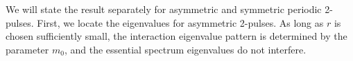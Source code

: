 \documentclass[11pt,reqno]{amsart}
\theoremstyle{plain}
\theoremstyle{definition}
\theoremstyle{remark}
\begin{document}

We will state the result separately for asymmetric and symmetric periodic 2-pulses. First, we locate the eigenvalues for asymmetric 2-pulses. As long as $r$ is chosen sufficiently small, the interaction eigenvalue pattern is determined by the parameter $m_0$, and the essential spectrum eigenvalues do not interfere.
\end{document}

